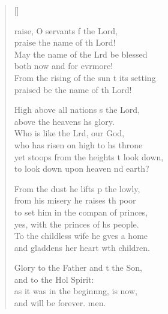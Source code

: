 \settowidth{\versewidth}{From the rising of the sun to its setting *}
\begin{verse}[\versewidth]
  \begin{patverse}
raise, O servants f the Lord,\Med\\
praise the name of th Lord!\\
May the name of the Lrd be blessed\Med\\
both now and for evrmore!\\
From the rising of the sun t its setting\Med\\
praised be the name of th Lord!

High above all nations \pointup{\i}s the Lord,\Med\\
above the heavens h\pointup{\i}s glory.\\
Who is like the Lrd, our God,\Med\\
who has risen on high to h\pointup{\i}s throne\\
yet stoops from the heights t look down,\Med\\
to look down upon heaven nd earth?

From the dust he lifts p the lowly,\Med\\
from his misery he raises th poor\\
to set him in the compan of princes,\Med\\
yes, with the princes of h\pointup{\i}s people.\\
To the childless wife he g\pointup{\i}ves a home\Med\\
and gladdens her heart w\pointup{\i}th children.

Glory to the Father and t the Son,\Med\\
and to the Hol Spirit:\\
as it was in the beginn\pointup{\i}ng, is now,\Med\\
and will be forever. men.
  \end{patverse}
\end{verse}
